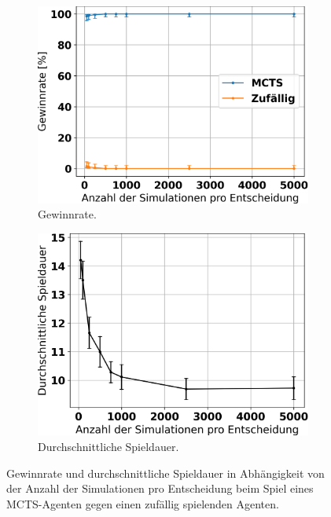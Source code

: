 \begin{figure}[ht!]%
	\begin{subfigure}[b]{0.48\textwidth}
		\includegraphics[width=\textwidth]{Bilder/mcts_vs_random_win_rate_vs_n_simulations.png}
		\caption{Gewinnrate.}
		\label{fig:f5}
	\end{subfigure}
	\hfill
	\begin{subfigure}[b]{0.48\textwidth}
		\includegraphics[width=\textwidth]{Bilder/mcts_vs_random_game_length_vs_n_simulations.png}
		\caption{Durchschnittliche Spieldauer.}
		\label{fig:f6}
	\end{subfigure}
	\caption{Gewinnrate und durchschnittliche Spieldauer in Abhängigkeit von der Anzahl der Simulationen pro Entscheidung beim Spiel eines MCTS-Agenten gegen einen zufällig spielenden Agenten.}
\end{figure}

